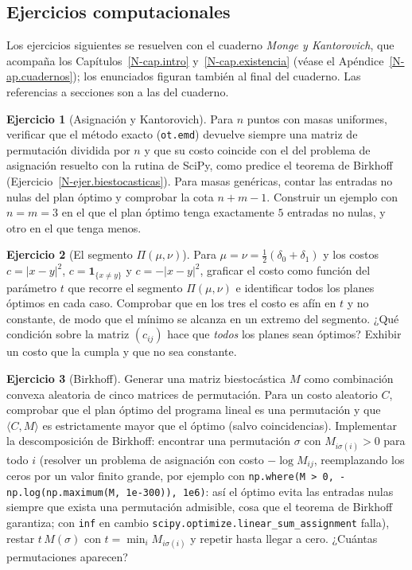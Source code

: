 \documentclass[11pt,a4paper]{amsart}
\newcounter{chapter}
\theoremstyle{remark}
\theoremstyle{definition}
\newtheorem{ejercicio}{Ejercicio}[chapter]
\numberwithin{subsection}{section}
\numberwithin{equation}{section}
\begin{document}
\subsection*{Ejercicios computacionales}

Los ejercicios siguientes se resuelven con el cuaderno \emph{Monge y
Kantorovich}, que acompaña los Capítulos~\ref{N-cap.intro} y~\ref{N-cap.existencia}
(véase el Apéndice~\ref{N-ap.cuadernos}); los enunciados figuran también al
final del cuaderno. Las referencias a secciones son a las del cuaderno.

\begin{ejercicio}[Asignación y Kantorovich]\label{ejc.MK.asignacion}
Para $n$ puntos con masas uniformes, verificar que el método exacto
(\texttt{ot.emd}) devuelve siempre una matriz de permutación dividida por $n$
y que su costo coincide con el del problema de asignación resuelto con la
rutina de SciPy, como predice el teorema de Birkhoff
(Ejercicio~\ref{N-ejer.biestocasticas}). Para masas genéricas, contar las
entradas no nulas del plan óptimo y comprobar la cota $n+m-1$. Construir un
ejemplo con $n=m=3$ en el que el plan óptimo tenga exactamente $5$ entradas no
nulas, y otro en el que tenga menos.
\end{ejercicio}

\begin{ejercicio}[El segmento $\Pi(\mu,\nu)$]\label{ejc.MK.segmento}
Para $\mu=\nu=\frac12(\delta_0+\delta_1)$ y los costos $c=|x-y|^2$,
$c=\mathbf 1_{\{x\ne y\}}$ y $c=-|x-y|^2$, graficar el costo como función del
parámetro $t$ que recorre el segmento $\Pi(\mu,\nu)$ e identificar todos los
planes óptimos en cada caso. Comprobar que en los tres el costo es afín en
$t$ y no constante, de modo que el mínimo se alcanza en un extremo del
segmento. ¿Qué condición sobre la matriz $(c_{ij})$ hace que \emph{todos} los
planes sean óptimos? Exhibir un costo que la cumpla y que no sea constante.
\end{ejercicio}

\begin{ejercicio}[Birkhoff]\label{ejc.MK.birkhoff}
Generar una matriz biestocástica $M$ como combinación convexa aleatoria de
cinco matrices de permutación. Para un costo aleatorio $C$, comprobar que el
plan óptimo del programa lineal es una permutación y que $\langle C,M\rangle$
es estrictamente mayor que el óptimo (salvo coincidencias). Implementar la
descomposición de Birkhoff: encontrar una permutación $\sigma$ con
$M_{i\sigma(i)}>0$ para todo $i$ (resolver un problema de asignación con costo
$-\log M_{ij}$, reemplazando los ceros por un valor finito grande, por
ejemplo con
\texttt{np.where(M > 0, -np.log(np.maximum(M, 1e-300)), 1e6)}: así el óptimo
evita las entradas nulas siempre que exista una permutación admisible, cosa
que el teorema de Birkhoff garantiza; con \texttt{inf} en cambio
\texttt{scipy.optimize.linear\_sum\_assignment} falla), restar $t\,M(\sigma)$ con $t=\min_iM_{i\sigma(i)}$ y repetir hasta
llegar a cero. ¿Cuántas permutaciones aparecen?
\end{ejercicio}
\end{document}
